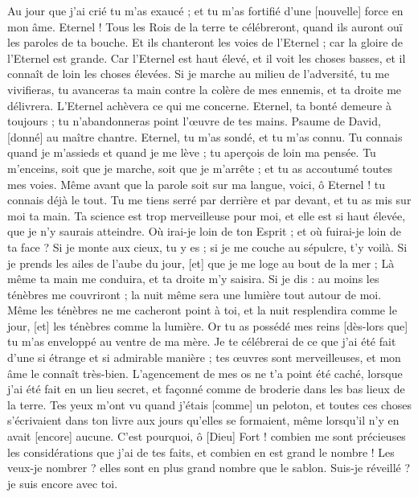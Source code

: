 \begin{multicols}{2}
Au jour que j'ai crié tu m'as exaucé ; et tu m'as fortifié d'une [nouvelle] force en mon âme.
Eternel ! Tous les Rois de la terre te célébreront, quand ils auront ouï les paroles de ta bouche.
Et ils chanteront les voies de l'Eternel ; car la gloire de l'Eternel est grande.
Car l'Eternel est haut élevé, et il voit les choses basses, et il connaît de loin les choses élevées.
Si je marche au milieu de l'adversité, tu me vivifieras, tu avanceras ta main contre la colère de mes ennemis, et ta droite me délivrera.
L'Eternel achèvera ce qui me concerne. Eternel, ta bonté demeure à toujours ; tu n'abandonneras point l'œuvre de tes mains.
\VerseOne{}Psaume de David, [donné] au maître chantre. Eternel, tu m'as sondé, et tu m'as connu.
Tu connais quand je m'assieds et quand je me lève ; tu aperçois de loin ma pensée.
Tu m'enceins, soit que je marche, soit que je m'arrête ; et tu as accoutumé toutes mes voies.
Même avant que la parole soit sur ma langue, voici, ô Eternel ! tu connais déjà le tout.
Tu me tiens serré par derrière et par devant, et tu as mis sur moi ta main.
Ta science est trop merveilleuse pour moi, et elle est si haut élevée, que je n'y saurais atteindre.
Où irai-je loin de ton Esprit ; et où fuirai-je loin de ta face ?
Si je monte aux cieux, tu y es ; si je me couche au sépulcre, t'y voilà.
Si je prends les ailes de l'aube du jour, [et] que je me loge au bout de la mer ;
Là même ta main me conduira, et ta droite m'y saisira.
Si je dis : au moins les ténèbres me couvriront ; la nuit même sera une lumière tout autour de moi.
Même les ténèbres ne me cacheront point à toi, et la nuit resplendira comme le jour, [et] les ténèbres comme la lumière.
Or tu as possédé mes reins [dès-lors que] tu m'as enveloppé au ventre de ma mère.
Je te célébrerai de ce que j'ai été fait d'une si étrange et si admirable manière ; tes œuvres sont merveilleuses, et mon âme le connaît très-bien.
L'agencement de mes os ne t'a point été caché, lorsque j'ai été fait en un lieu secret, et façonné comme de broderie dans les bas lieux de la terre.
Tes yeux m'ont vu quand j'étais [comme] un peloton, et toutes ces choses s'écrivaient dans ton livre aux jours qu'elles se formaient, même lorsqu'il n'y en avait [encore] aucune.
C'est pourquoi, ô [Dieu] Fort ! combien me sont précieuses les considérations que j'ai de tes faits, et combien en est grand le nombre !
Les veux-je nombrer ? elles sont en plus grand nombre que le sablon. Suis-je réveillé ? je suis encore avec toi.

\end{multicols}
